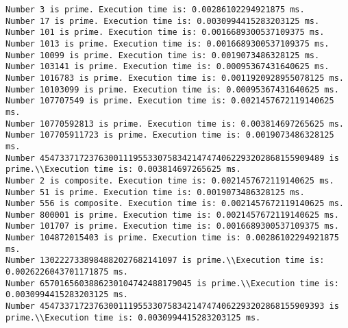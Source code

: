 \documentclass[11pt]{article}
\begin{document}
    \begin{Verbatim}[commandchars=\\\{\}]
Number 3 is prime. Execution time is: 0.00286102294921875 ms.
Number 17 is prime. Execution time is: 0.0030994415283203125 ms.
Number 101 is prime. Execution time is: 0.0016689300537109375 ms.
Number 1013 is prime. Execution time is: 0.0016689300537109375 ms.
Number 10099 is prime. Execution time is: 0.0019073486328125 ms.
Number 103141 is prime. Execution time is: 0.00095367431640625 ms.
Number 1016783 is prime. Execution time is: 0.0011920928955078125 ms.
Number 10103099 is prime. Execution time is: 0.00095367431640625 ms.
Number 107707549 is prime. Execution time is: 0.0021457672119140625 ms.
Number 10770592813 is prime. Execution time is: 0.003814697265625 ms.
Number 107705911723 is prime. Execution time is: 0.0019073486328125 ms.
Number 4547337172376300111955330758342147474062293202868155909489 is prime.\\Execution time is: 0.003814697265625 ms.
Number 2 is composite. Execution time is: 0.0021457672119140625 ms.
Number 51 is prime. Execution time is: 0.0019073486328125 ms.
Number 556 is composite. Execution time is: 0.0021457672119140625 ms.
Number 800001 is prime. Execution time is: 0.0021457672119140625 ms.
Number 101707 is prime. Execution time is: 0.0016689300537109375 ms.
Number 104872015403 is prime. Execution time is: 0.00286102294921875 ms.
Number 1302227338984882027682141097 is prime.\\Execution time is: 0.0026226043701171875 ms.
Number 6570165603886230104742488179045 is prime.\\Execution time is: 0.0030994415283203125 ms.
Number 4547337172376300111955330758342147474062293202868155909393 is prime.\\Execution time is: 0.0030994415283203125 ms.
\end{Verbatim}
\end{document}
